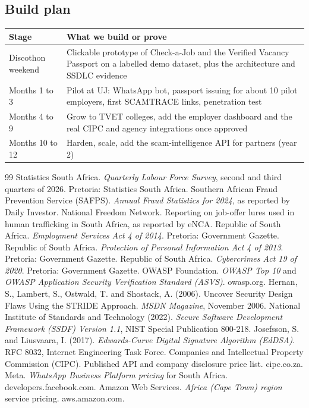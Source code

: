 \documentclass[11pt,a4paper]{article}
\newcommand{\tbl}[1]{\textbf{#1}}
\begin{document}
\subsection{Build plan}
\begin{center}
\begin{tabularx}{\textwidth}{@{}>{\raggedright\arraybackslash}p{3.0cm}X@{}}
\toprule
\tbl{Stage} & \tbl{What we build or prove}\\
\midrule
Discothon weekend & Clickable prototype of Check-a-Job and the Verified Vacancy Passport on a labelled demo dataset, plus the architecture and SSDLC evidence\\
Months 1 to 3 & Pilot at UJ: WhatsApp bot, passport issuing for about 10 pilot employers, first SCAMTRACE links, penetration test\\
Months 4 to 9 & Grow to TVET colleges, add the employer dashboard and the real CIPC and agency integrations once approved\\
Months 10 to 12 & Harden, scale, add the scam-intelligence API for partners (year 2)\\
\bottomrule
\end{tabularx}
\end{center}

\clearpage
{}
\begin{thebibliography}{99}
\setlength{\itemsep}{6pt}
 Statistics South Africa. \emph{Quarterly Labour Force Survey}, second and third quarters of 2026. Pretoria: Statistics South Africa.
 Southern African Fraud Prevention Service (SAFPS). \emph{Annual Fraud Statistics for 2024}, as reported by Daily Investor.
 National Freedom Network. Reporting on job-offer lures used in human trafficking in South Africa, as reported by eNCA.
 Republic of South Africa. \emph{Employment Services Act 4 of 2014}. Pretoria: Government Gazette.
 Republic of South Africa. \emph{Protection of Personal Information Act 4 of 2013}. Pretoria: Government Gazette.
 Republic of South Africa. \emph{Cybercrimes Act 19 of 2020}. Pretoria: Government Gazette.
 OWASP Foundation. \emph{OWASP Top 10} and \emph{OWASP Application Security Verification Standard (ASVS)}. owasp.org.
 Hernan, S., Lambert, S., Ostwald, T. and Shostack, A. (2006). Uncover Security Design Flaws Using the STRIDE Approach. \emph{MSDN Magazine}, November 2006.
 National Institute of Standards and Technology (2022). \emph{Secure Software Development Framework (SSDF) Version 1.1}, NIST Special Publication 800-218.
 Josefsson, S. and Liusvaara, I. (2017). \emph{Edwards-Curve Digital Signature Algorithm (EdDSA)}. RFC 8032, Internet Engineering Task Force.
 Companies and Intellectual Property Commission (CIPC). Published API and company disclosure price list. cipc.co.za.
 Meta. \emph{WhatsApp Business Platform pricing} for South Africa. developers.facebook.com.
 Amazon Web Services. \emph{Africa (Cape Town) region} service pricing. aws.amazon.com.
\end{thebibliography}
\end{document}
